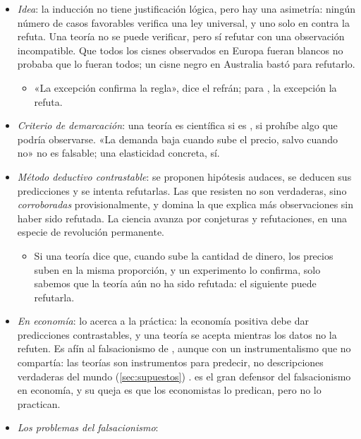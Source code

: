 \documentclass[11pt]{article}
\begin{document}
\begin{itemize}
\item \emph{Idea}: la inducción no tiene justificación lógica, pero hay una asimetría: ningún número de casos favorables verifica una ley universal, y uno solo en contra la refuta\nocite{Popper1934Logik}. Una teoría no se puede verificar, pero sí refutar con una observación incompatible. Que todos los cisnes observados en Europa fueran blancos no probaba que lo fueran todos; un cisne negro en Australia bastó para refutarlo.
  \begin{itemize}
  \item «La excepción confirma la regla», dice el refrán; para , la excepción la refuta.
  \end{itemize}
\item \emph{Criterio de demarcación}: una teoría es científica si es , si prohíbe algo que podría observarse. «La demanda baja cuando sube el precio, salvo cuando no» no es falsable; una elasticidad concreta, sí.
\item \emph{Método deductivo contrastable}: se proponen hipótesis audaces, se deducen sus predicciones y se intenta refutarlas. Las que resisten no son verdaderas, sino \emph{corroboradas} provisionalmente, y domina la que explica más observaciones sin haber sido refutada. La ciencia avanza por conjeturas y refutaciones, en una especie de revolución permanente\nocite{Popper1963Conjectures}.
  \begin{itemize}
  \item Si una teoría dice que, cuando sube la cantidad de dinero, los precios suben en la misma proporción, y un experimento lo confirma, solo sabemos que la teoría aún no ha sido refutada: el siguiente puede refutarla.
  \end{itemize}
\item \emph{En economía}: \textcite{Friedman1953Methodology} lo acerca a la práctica: la economía positiva debe dar predicciones contrastables, y una teoría se acepta mientras los datos no la refuten. Es afín al falsacionismo de , aunque con un instrumentalismo que  no compartía: las teorías son instrumentos para predecir, no descripciones verdaderas del mundo\nocite{Boland1979Critique} (\ref{sec:supuestos}) . \textcite{Blaug1992Methodology} es el gran defensor del falsacionismo en economía, y su queja es que los economistas lo predican, pero no lo practican.
\item \emph{Los problemas del falsacionismo}:
  \begin{itemize}

\end{itemize}
\end{itemize}
\end{document}
